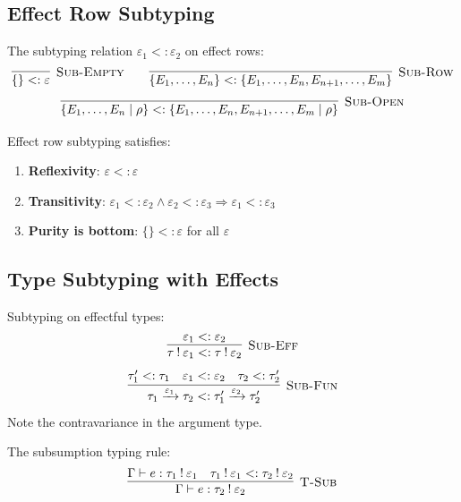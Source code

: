 \subsection{Effect Row Subtyping}
\label{subsec:effect-subtyping-rules}

\begin{definition}
\label{def:effect-row-subtype}
The subtyping relation $\varepsilon_1 <: \varepsilon_2$ on effect rows:
\[
\infer[\textsc{Sub-Empty}]
  {\{\} <: \varepsilon}
  {}
\qquad
\infer[\textsc{Sub-Row}]
  {\{E_1, \ldots, E_n\} <: \{E_1, \ldots, E_n, E_{n+1}, \ldots, E_m\}}
  {}
\]
\[
\infer[\textsc{Sub-Open}]
  {\{E_1, \ldots, E_n \mid \rho\} <: \{E_1, \ldots, E_n, E_{n+1}, \ldots, E_m \mid \rho\}}
  {}
\]
\end{definition}

\begin{proposition}
\label{prop:subtyping-props}
Effect row subtyping satisfies:
\begin{enumerate}
  \item \textbf{Reflexivity}: $\varepsilon <: \varepsilon$
  \item \textbf{Transitivity}: $\varepsilon_1 <: \varepsilon_2 \land \varepsilon_2 <: \varepsilon_3 \Rightarrow \varepsilon_1 <: \varepsilon_3$
  \item \textbf{Purity is bottom}: $\{\} <: \varepsilon$ for all $\varepsilon$
\end{enumerate}
\end{proposition}

\subsection{Type Subtyping with Effects}
\label{subsec:type-subtyping}

\begin{definition}
\label{def:effectful-subtype}
Subtyping on effectful types:
\[
\infer[\textsc{Sub-Eff}]
  {\tau \mathbin{!} \varepsilon_1 <: \tau \mathbin{!} \varepsilon_2}
  {\varepsilon_1 <: \varepsilon_2}
\]
\[
\infer[\textsc{Sub-Fun}]
  {\tau_1 \xrightarrow{\varepsilon_1} \tau_2 <: \tau_1' \xrightarrow{\varepsilon_2} \tau_2'}
  {\tau_1' <: \tau_1 & \varepsilon_1 <: \varepsilon_2 & \tau_2 <: \tau_2'}
\]
Note the contravariance in the argument type.
\end{definition}

\begin{definition}
\label{def:subsumption}
The subsumption typing rule:
\[
\infer[\textsc{T-Sub}]
  {\Gamma \vdash e : \tau_2 \mathbin{!} \varepsilon_2}
  {\Gamma \vdash e : \tau_1 \mathbin{!} \varepsilon_1 & \tau_1 \mathbin{!} \varepsilon_1 <: \tau_2 \mathbin{!} \varepsilon_2}
\]
\end{definition}

